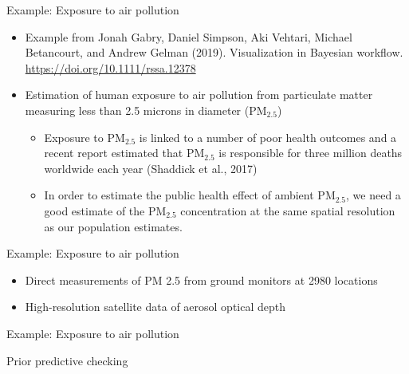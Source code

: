 \documentclass[t]{beamer}
\begin{document}
\begin{frame}{Example: Exposure to air pollution}

  \begin{itemize}
  \item Example from Jonah Gabry, Daniel Simpson, Aki Vehtari, Michael
    Betancourt, and Andrew Gelman (2019). Visualization in Bayesian
    workflow. \url{https://doi.org/10.1111/rssa.12378}
  \item Estimation of human exposure to air pollution from particulate
    matter measuring less than 2.5 microns in diameter ($\mathrm{PM}_{2.5}$)
    \begin{itemize}
    \item Exposure to $\mathrm{PM}_{2.5}$ is linked to a number of
      poor health outcomes and a recent report estimated that
      $\mathrm{PM}_{2.5}$ is responsible for three million deaths
      worldwide each year (Shaddick et al., 2017)
    \item In order to estimate the public health effect of ambient
      $\mathrm{PM}_{2.5}$, we need a good estimate of the
      $\mathrm{PM}_{2.5}$ concentration at the same spatial resolution
      as our population estimates.
    \end{itemize}
\end{itemize}

\end{frame}

\begin{frame}{Example: Exposure to air pollution}

  \begin{itemize}
  \item Direct measurements of PM 2.5 from ground monitors at 2980
    locations
  \item High-resolution satellite data of aerosol optical depth
    
  \end{itemize}
  \begin{center}
\end{center}
\end{frame}

\begin{frame}{Example: Exposure to air pollution}

  Prior predictive checking
  \vspace{-1\baselineskip}
  \begin{center}
\end{center}
\end{frame}
\end{document}
